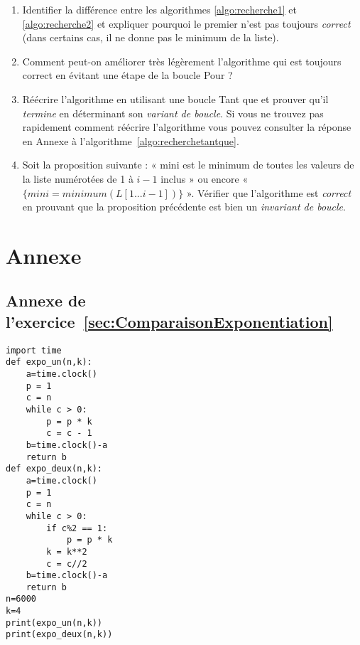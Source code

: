 \begin{enumerate}

\item Identifier la différence entre les algorithmes \ref{algo:recherche1} et \ref{algo:recherche2} et expliquer pourquoi le premier n'est pas toujours \textit{correct} (dans certains cas, il ne donne pas le minimum de la liste).

\item Comment peut-on améliorer très légèrement l'algorithme qui est toujours correct en évitant une étape de la boucle Pour ?

\item Réécrire l'algorithme en utilisant une boucle Tant que et prouver qu'il \textit{termine} en déterminant son \textit{variant de boucle}. Si vous ne trouvez pas rapidement comment réécrire l'algorithme vous pouvez consulter la réponse en Annexe à l'algorithme~\ref{algo:recherchetantque}.

\item Soit la proposition suivante : « mini est le minimum de toutes les valeurs de la liste numérotées de 1 à $i-1$ inclus » ou encore « $\{mini = minimum(L[1...i-1])\}$ ». Vérifier que l'algorithme est \textit{correct} en prouvant que la proposition précédente est bien un \textit{invariant de boucle}.

\end{enumerate}

\newpage
\section*{Annexe}

\subsection*{Annexe de l'exercice~\ref{sec:ComparaisonExponentiation}}

\begin{boxedminipage}{\textwidth}
\begin{verbatim}
import time
def expo_un(n,k):
    a=time.clock()
    p = 1
    c = n
    while c > 0:
        p = p * k
        c = c - 1
    b=time.clock()-a
    return b
def expo_deux(n,k):
    a=time.clock()
    p = 1
    c = n
    while c > 0:
        if c%2 == 1:
            p = p * k
        k = k**2
        c = c//2
    b=time.clock()-a
    return b
n=6000
k=4
print(expo_un(n,k))
print(expo_deux(n,k))
\end{verbatim}
\end{boxedminipage}

